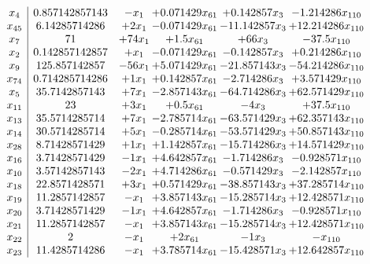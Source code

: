 \documentclass[11pt]{article}
\begin{document}
\[\begin{array}{c| c c@{\hskip 2pt} c@{\hskip 2pt} c@{\hskip 2pt} c@{\hskip 2pt} }
 x_{4}   &  0.857142857143 & - x_{1} & + 0.071429 x_{61} & + 0.142857 x_{3} & -1.214286 x_{110}\\
 x_{45}   &  6.14285714286 & + 2 x_{1} & -0.071429 x_{61} & -11.142857 x_{3} & + 12.214286 x_{110}\\
 x_{7}   &  71 & + 74 x_{1} & + 1.5 x_{61} & + 66 x_{3} & -37.5 x_{110}\\
 x_{2}   &  0.142857142857 & +  x_{1} & -0.071429 x_{61} & -0.142857 x_{3} & + 0.214286 x_{110}\\
 x_{9}   &  125.857142857 & -56 x_{1} & + 5.071429 x_{61} & -21.857143 x_{3} & -54.214286 x_{110}\\
 x_{74}   &  0.714285714286 & + 1 x_{1} & + 0.142857 x_{61} & -2.714286 x_{3} & + 3.571429 x_{110}\\
 x_{5}   &  35.7142857143 & + 7 x_{1} & -2.857143 x_{61} & -64.714286 x_{3} & + 62.571429 x_{110}\\
 x_{11}   &  23 & + 3 x_{1} & + 0.5 x_{61} & -4 x_{3} & + 37.5 x_{110}\\
 x_{13}   &  35.5714285714 & + 7 x_{1} & -2.785714 x_{61} & -63.571429 x_{3} & + 62.357143 x_{110}\\
 x_{14}   &  30.5714285714 & + 5 x_{1} & -0.285714 x_{61} & -53.571429 x_{3} & + 50.857143 x_{110}\\
 x_{28}   &  8.71428571429 & + 1 x_{1} & + 1.142857 x_{61} & -15.714286 x_{3} & + 14.571429 x_{110}\\
 x_{16}   &  3.71428571429 & -1 x_{1} & + 4.642857 x_{61} & -1.714286 x_{3} & -0.928571 x_{110}\\
 x_{10}   &  3.57142857143 & -2 x_{1} & + 4.714286 x_{61} & -0.571429 x_{3} & -2.142857 x_{110}\\
 x_{18}   &  22.8571428571 & + 3 x_{1} & + 0.571429 x_{61} & -38.857143 x_{3} & + 37.285714 x_{110}\\
 x_{19}   &  11.2857142857 & - x_{1} & + 3.857143 x_{61} & -15.285714 x_{3} & + 12.428571 x_{110}\\
 x_{20}   &  3.71428571429 & -1 x_{1} & + 4.642857 x_{61} & -1.714286 x_{3} & -0.928571 x_{110}\\
 x_{21}   &  11.2857142857 & - x_{1} & + 3.857143 x_{61} & -15.285714 x_{3} & + 12.428571 x_{110}\\
 x_{22}   &  2 & - x_{1} & + 2 x_{61} & -1 x_{3} & - x_{110}\\
 x_{23}   &  11.4285714286 & - x_{1} & + 3.785714 x_{61} & -15.428571 x_{3} & + 12.642857 x_{110}\\

\end{array}\]
\end{document}
